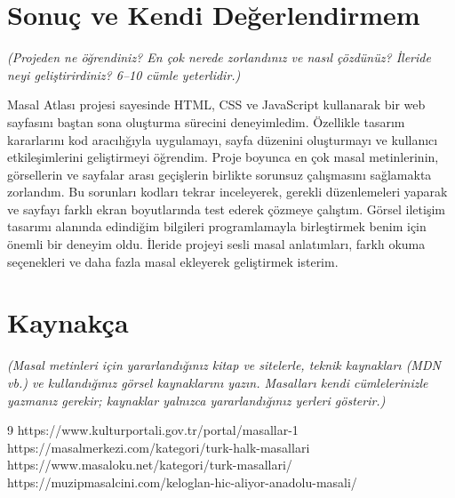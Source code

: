 \documentclass[12pt,a4paper]{article}
\newcommand{\aciklama}[1]{{\color{gray}\itshape (#1)}}
\begin{document}
\section{Sonuç ve Kendi Değerlendirmem}
\aciklama{Projeden ne öğrendiniz? En çok nerede zorlandınız ve nasıl çözdünüz? İleride
neyi geliştirirdiniz? 6--10 cümle yeterlidir.}

Masal Atlası projesi sayesinde HTML, CSS ve JavaScript kullanarak bir web sayfasını baştan sona oluşturma sürecini deneyimledim. Özellikle tasarım kararlarını kod aracılığıyla uygulamayı, sayfa düzenini oluşturmayı ve kullanıcı etkileşimlerini geliştirmeyi öğrendim. Proje boyunca en çok masal metinlerinin, görsellerin ve sayfalar arası geçişlerin birlikte sorunsuz çalışmasını sağlamakta zorlandım. Bu sorunları kodları tekrar inceleyerek, gerekli düzenlemeleri yaparak ve sayfayı farklı ekran boyutlarında test ederek çözmeye çalıştım. Görsel iletişim tasarımı alanında edindiğim bilgileri programlamayla birleştirmek benim için önemli bir deneyim oldu. İleride projeyi sesli masal anlatımları, farklı okuma seçenekleri ve daha fazla masal ekleyerek geliştirmek isterim.

\section{Kaynakça}
\aciklama{Masal metinleri için yararlandığınız kitap ve sitelerle, teknik kaynakları
(MDN vb.) ve kullandığınız görsel kaynaklarını yazın. Masalları kendi
cümlelerinizle yazmanız gerekir; kaynaklar yalnızca yararlandığınız yerleri
gösterir.}

\begin{thebibliography}{9}
 https://www.kulturportali.gov.tr/portal/masallar-1
 https://masalmerkezi.com/kategori/turk-halk-masallari
 https://www.masaloku.net/kategori/turk-masallari/
 https://muzipmasalcini.com/keloglan-hic-aliyor-anadolu-masali/
\end{thebibliography}

\appendix
\end{document}
